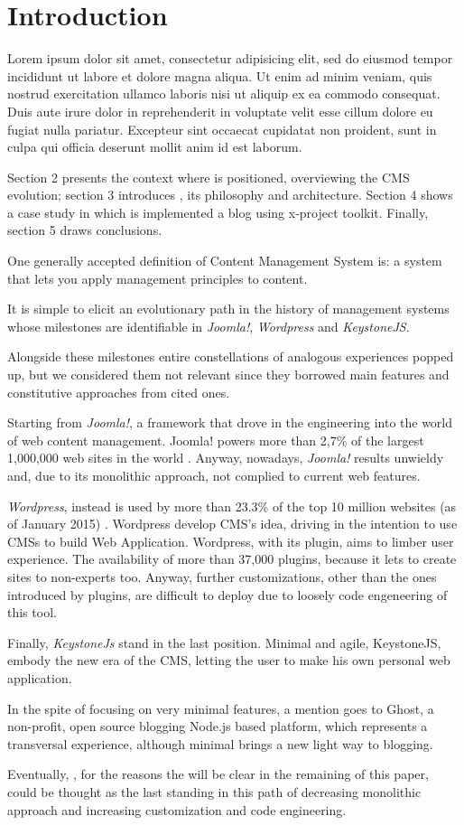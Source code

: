 \section{Introduction}
Lorem ipsum dolor sit amet, consectetur adipisicing elit, sed do eiusmod
tempor incididunt ut labore et dolore magna aliqua. Ut enim ad minim veniam,
quis nostrud exercitation ullamco laboris nisi ut aliquip ex ea commodo
consequat. Duis aute irure dolor in reprehenderit in voluptate velit esse
cillum dolore eu fugiat nulla pariatur. Excepteur sint occaecat cupidatat non
proident, sunt in culpa qui officia deserunt mollit anim id est laborum.


Section 2 presents the context where  is positioned, overviewing the CMS evolution; section 3 introduces , its philosophy and architecture. Section 4 shows a case study in which is implemented a blog using x-project toolkit. Finally, section 5 draws conclusions.


One generally accepted definition of Content Management System is: a system that lets you apply management principles to content.

It is simple to elicit an evolutionary path in the history of management systems whose milestones are identifiable in \emph{Joomla!}, \emph{Wordpress} and \emph{KeystoneJS}.

Alongside these milestones entire constellations of analogous experiences popped up, but we considered them not relevant since they borrowed main features and constitutive approaches from cited ones. 

Starting from \emph{Joomla!}, a framework that drove in the engineering into the world of web content management. Joomla! powers more than 2,7\% of the largest 1,000,000 web sites in the world \cite{usage-cms}. Anyway, nowadays, \emph{Joomla!} results unwieldy and, due to its monolithic approach, not complied to current web features.

\emph{Wordpress}, instead is used by more than 23.3\% of the top 10 million websites (as of January 2015) \cite{usage-cms}. Wordpress develop CMS’s idea, driving in the intention to use CMSs to build Web Application. Wordpress, with its plugin, aims to limber user experience. The availability of more than 37,000 plugins, because it lets to create sites to non-experts too.
Anyway, further customizations, other than the ones introduced by plugins, are difficult to deploy due to loosely code engeneering of this tool.

Finally, \emph{KeystoneJs} stand in the last position. Minimal and agile, KeystoneJS, embody the new era of the CMS, letting the user to make his own personal web application.

In the spite of focusing on very minimal features, a mention goes to Ghost, a non-profit, open source blogging Node.js based platform, which represents a transversal experience, although minimal brings a new light way to blogging.

Eventually, , for the reasons the will be clear in the remaining of this paper, could be thought as the last standing in this path of decreasing monolithic approach and increasing customization and code engineering.


